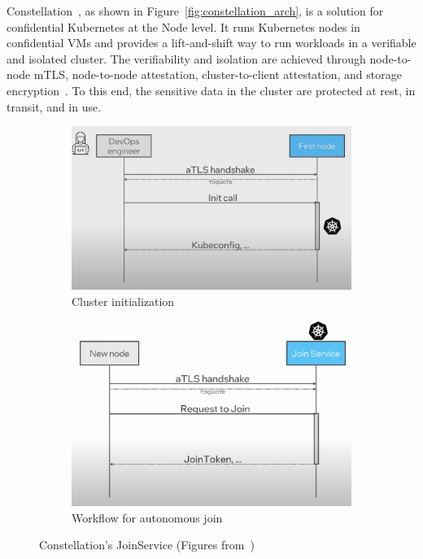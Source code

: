 Constellation~\cite*{Constellation}, as shown in Figure~\ref{fig:constellation_arch}, is a solution for confidential Kubernetes at the Node level. It runs Kubernetes nodes in confidential VMs and provides a lift-and-shift way to run workloads in a verifiable and isolated cluster. The verifiability and isolation are achieved through node-to-node mTLS, 
node-to-node attestation, cluster-to-client attestation, and storage encryption~\cite*{Constellation_Encrypted_Kubernetes}. To this end, the sensitive data in the cluster are protected at rest, in transit, and in use. 
 
\begin{figure}[htp]
    \centering
    \begin{subfigure}[b]{0.45\textwidth}
        \centering
        \includegraphics[width=\textwidth]{images/constellation_join_1.png}
        \caption{Cluster initialization}
        \label{fig:constellation_join_1}
    \end{subfigure}
    \hfill
    \begin{subfigure}[b]{0.45\textwidth}
        \centering
        \includegraphics[width=\textwidth]{images/constellation_join_2.png}
        \caption{Workflow for autonomous join}
        \label{fig:constellation_join_2}
    \end{subfigure}
    \hfill
       \caption[Constellation's JoinService]{Constellation's JoinService (Figures from~\cite*{Constellation_Always_encrypted})}
       \label{fig:constellation_join}
\end{figure}


